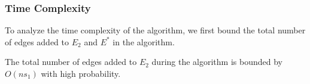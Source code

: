 


\subsubsection{Time Complexity} \label{sec:warmup_add_time}

To analyze the time complexity of the algorithm, we first bound the total number of edges added to $E_2$ and $E^*$ in the algorithm. 

\begin{claim} \label{claim_E2}
The total number of edges added to $E_2$ during the algorithm is bounded by $O(ns_1)$ with high probability.%
\end{claim}

